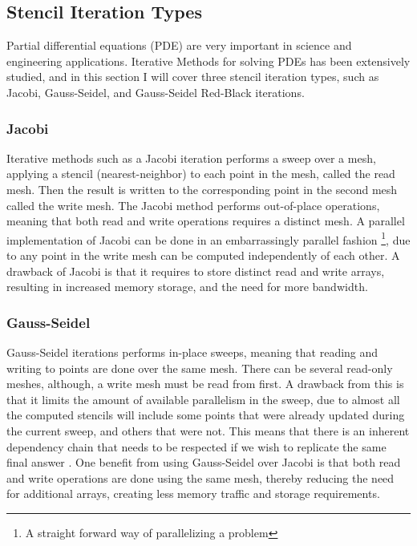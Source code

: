 \subsection{Stencil Iteration Types}
\label{subsec:stencil_iteration_types}
Partial differential equations (PDE) are very important in science and engineering applications. Iterative Methods for solving PDEs has been extensively studied, and in this section I will cover three stencil iteration types, such as Jacobi, Gauss-Seidel, and Gauss-Seidel Red-Black iterations.

\subsubsection{Jacobi}
Iterative methods such as a Jacobi iteration performs a sweep over a mesh, applying a stencil (nearest-neighbor) to each point in the mesh, called the read mesh. Then the result is written to the corresponding point in the second mesh called the write mesh. The Jacobi method performs out-of-place operations, meaning that both read and write operations requires a distinct mesh. A parallel implementation of Jacobi can be done in an embarrassingly parallel fashion \footnote{A straight forward way of parallelizing a problem}, due to any point in the write mesh can be computed independently of each other. A drawback of Jacobi is that it requires to store distinct read and write arrays, resulting in increased memory storage, and the need for more bandwidth.

\subsubsection{Gauss-Seidel}
Gauss-Seidel iterations performs in-place sweeps, meaning that reading and writing to points are done over the same mesh. There can be several read-only meshes, although, a write mesh must be read from first. A drawback from this is that it limits the amount of available parallelism in the sweep, due to almost all the computed stencils will include some points that were already updated during the current sweep, and others that were not. This means that there is an inherent dependency chain that needs to be respected if we wish to replicate the same final answer \cite{article9}. One benefit from using Gauss-Seidel over Jacobi is that both read and write operations are done using the same mesh, thereby reducing the need for additional arrays, creating less memory traffic and storage requirements. 

